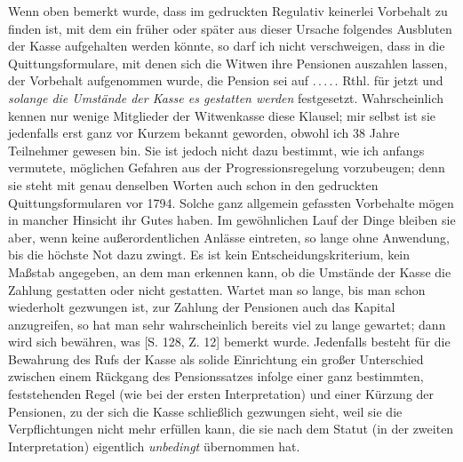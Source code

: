 Wenn oben bemerkt wurde, dass im gedruckten Regulativ keinerlei Vorbehalt zu finden ist, mit dem ein früher oder später aus dieser Ursache folgendes Ausbluten der Kasse aufgehalten werden könnte, so darf ich nicht verschweigen, dass in die Quittungsformulare, mit denen sich die Witwen ihre Pensionen auszahlen lassen, der Vorbehalt aufgenommen wurde, die Pension sei auf .\,.\,.\,.\,. Rthl. für jetzt und \textit{solange die Umstände der Kasse es gestatten werden} festgesetzt. Wahrscheinlich kennen nur wenige Mitglieder der Witwenkasse diese Klausel; mir selbst ist sie jedenfalls erst ganz vor Kurzem bekannt geworden, obwohl ich 38 Jahre Teilnehmer gewesen bin. Sie ist jedoch nicht dazu bestimmt, wie ich anfangs vermutete, möglichen Gefahren aus der Progressionsregelung vorzubeugen; denn sie steht mit genau denselben Worten auch schon in den gedruckten Quittungsformularen vor 1794. Solche ganz allgemein gefassten Vorbehalte mögen in mancher Hinsicht ihr Gutes haben. Im gewöhnlichen Lauf der Dinge bleiben sie aber, wenn keine außerordentlichen Anlässe eintreten, so lange ohne Anwendung, bis die höchste Not dazu zwingt. Es ist kein Entscheidungskriterium, kein Maßstab angegeben, an dem man erkennen kann, ob die Umstände der Kasse die Zahlung gestatten oder nicht gestatten. Wartet man so lange, bis man schon wiederholt gezwungen ist, zur Zahlung der Pensionen auch das Kapital anzugreifen, so hat man sehr wahrscheinlich bereits viel zu lange gewartet; dann wird sich bewähren, was [S. 128, Z. 12] bemerkt wurde. Jedenfalls besteht für die Bewahrung des Rufs der Kasse als solide Einrichtung ein großer Unterschied zwischen einem Rückgang des Pensionssatzes infolge einer ganz bestimmten, feststehenden Regel (wie bei der ersten Interpretation) und einer Kürzung der Pensionen, zu der sich die Kasse schließlich gezwungen sieht, weil sie die Verpflichtungen nicht mehr erfüllen kann, die sie nach dem
Statut (in der zweiten Interpretation) eigentlich \textit{unbedingt} übernommen hat.

